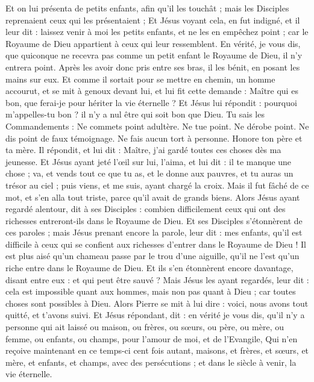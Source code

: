 \begin{multicols}{2}
Et on lui présenta de petits enfants, afin qu'il les touchât ; mais les Disciples reprenaient ceux qui les présentaient ;
Et Jésus voyant cela, en fut indigné, et il leur dit : laissez venir à moi les petits enfants, et ne les en empêchez point ; car le Royaume de Dieu appartient à ceux qui leur ressemblent.
En vérité, je vous dis, que quiconque ne recevra pas comme un petit enfant le Royaume de Dieu, il n'y entrera point.
Après les avoir donc pris entre ses bras, il les bénit, en posant les mains sur eux.
Et comme il sortait pour se mettre en chemin, un homme accourut, et se mit à genoux devant lui, et lui fit cette demande : Maître qui es bon, que ferai-je pour hériter la vie éternelle ?
Et Jésus lui répondit : pourquoi m'appelles-tu bon ? il n'y a nul être qui soit bon que Dieu.
Tu sais les Commandements : Ne commets point adultère. Ne tue point. Ne dérobe point. Ne dis point de faux témoignage. Ne fais aucun tort à personne. Honore ton père et ta mère.
Il répondit, et lui dit : Maître, j'ai gardé toutes ces choses dès ma jeunesse.
Et Jésus ayant jeté l'œil sur lui, l'aima, et lui dit : il te manque une chose ; va, et vends tout ce que tu as, et le donne aux pauvres, et tu auras un trésor au ciel ; puis viens, et me suis, ayant chargé la croix.
Mais il fut fâché de ce mot, et s'en alla tout triste, parce qu'il avait de grands biens.
Alors Jésus ayant regardé alentour, dit à ses Disciples : combien difficilement ceux qui ont des richesses entreront-ils dans le Royaume de Dieu.
Et ses Disciples s'étonnèrent de ces paroles ; mais Jésus prenant encore la parole, leur dit : mes enfants, qu'il est difficile à ceux qui se confient aux richesses d'entrer dans le Royaume de Dieu !
Il est plus aisé qu'un chameau passe par le trou d'une aiguille, qu'il ne l'est qu'un riche entre dans le Royaume de Dieu.
Et ils s'en étonnèrent encore davantage, disant entre eux : et qui peut être sauvé ?
Mais Jésus les ayant regardés, leur dit : cela est impossible quant aux hommes, mais non pas quant à Dieu ; car toutes choses sont possibles à Dieu.
Alors Pierre se mit à lui dire : voici, nous avons tout quitté, et t'avons suivi.
Et Jésus répondant, dit : en vérité je vous dis, qu’il n'y a personne qui ait laissé ou maison, ou frères, ou sœurs, ou père, ou mère, ou femme, ou enfants, ou champs, pour l'amour de moi, et de l’Evangile,
Qui n'en reçoive maintenant en ce temps-ci cent fois autant, maisons, et frères, et sœurs, et mère, et enfants, et champs, avec des persécutions ; et dans le siècle à venir, la vie éternelle.

\end{multicols}

